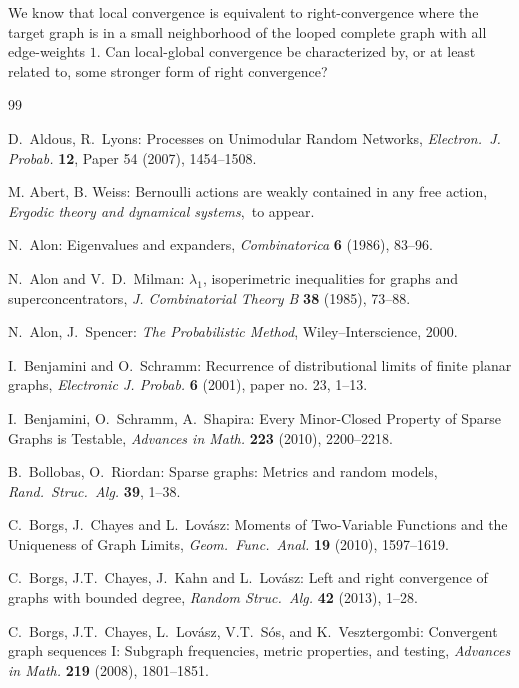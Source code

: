 \documentclass{article}
\begin{document}
We know \cite{BCKL} that local convergence is equivalent to
right-convergence where the target graph is in a small neighborhood
of the looped complete graph with all edge-weights $1$. Can
local-global convergence be characterized by, {or at least related
to,} some stronger form of right convergence?

\begin{thebibliography}{99}


 D.~Aldous, R.~Lyons: Processes on Unimodular
    Random Networks, {\it Electron.\ J. Probab.} {\bf 12}, Paper 54
    (2007), 1454--1508.

 M. Abert, B. Weiss: Bernoulli actions are weakly
    contained in any free action, \emph{Ergodic theory and dynamical
    systems},~to appear.

 N.~Alon: Eigenvalues and expanders,
    \emph{Combinatorica} {\bf 6} (1986), 83--96.

 N.~Alon and V.~D.~Milman: $\lambda_1$, isoperimetric
    inequalities for graphs and superconcentrators, \emph{J.
    Combinatorial Theory B} {\bf 38} (1985), 73--88.

 N.~Alon, J.~Spencer: \emph{The Probabilistic Method},
    Wiley--Interscience, 2000.

 I.~Benjamini and O.~Schramm: Recurrence of
    distributional limits of finite planar graphs, \emph{Electronic
    J. Probab.} {\bf 6} (2001), paper no. 23, 1--13.

 I.~Benjamini, O.~Schramm, A.~Shapira: Every
    Minor-Closed Property of Sparse Graphs is Testable,
    \emph{Advances in Math.} {\bf223} (2010), 2200--2218.

 B.~Bollobas, O.~Riordan: Sparse graphs: Metrics and
    random models, \emph{Rand.\ Struc.\ Alg.} {\bf39}, 1--38.

 C.~Borgs, J.~Chayes and L.~Lov\'asz: Moments of
    Two-Variable Functions and the Uniqueness of Graph Limits,
    {\it Geom.\ Func.\ Anal.} {\bf 19} (2010), 1597--1619.

 C.~Borgs, J.T.~Chayes, J.~Kahn and L.~Lov\'asz: Left
    and right convergence of graphs with bounded degree, {\it Random
    Struc.\ Alg.} {\bf 42} (2013), 1--28.

 C.~Borgs, J.T.~Chayes, L.~Lov\'asz, V.T.~S\'os, and
    K.~Vesztergombi: Convergent graph sequences I: Subgraph
    frequencies, metric properties, and testing, \emph{Advances in
    Math.} {\bf219} (2008), 1801--1851.


\end{thebibliography}
\end{document}
